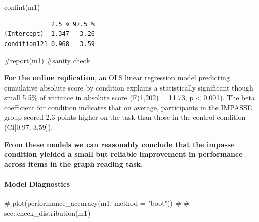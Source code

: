 \documentclass[
  letterpaper,
  DIV=11,
  numbers=noendperiod]{scrreprt}
\let\oldparagraph\paragraph
\renewcommand{\paragraph}[1]{\oldparagraph{#1}\mbox{}}
\newenvironment{Shaded}{\begin{snugshade}}{\end{snugshade}}
\newcommand{\CommentTok}[1]{\textcolor[rgb]{0.37,0.37,0.37}{#1}}
\newcommand{\FunctionTok}[1]{\textcolor[rgb]{0.28,0.35,0.67}{#1}}
\newcommand{\NormalTok}[1]{\textcolor[rgb]{0.00,0.23,0.31}{#1}}
\begin{document}
\begin{Shaded}
\begin{Highlighting}[]
\FunctionTok{confint}\NormalTok{(m1)}
\end{Highlighting}
\end{Shaded}

\begin{verbatim}
             2.5 % 97.5 %
(Intercept)  1.347   3.26
condition121 0.968   3.59
\end{verbatim}

\begin{Shaded}
\begin{Highlighting}[]
\CommentTok{\#report(m1) \#sanity check}
\end{Highlighting}
\end{Shaded}

\textbf{For the online replication}, an OLS linear regression model
predicting cumulative absolute score by condition explains a
statistically significant though small 5.5\% of variance in absolute
score (F(1,202) = 11.73, p \textless{} 0.001). The beta coefficient for
condition indicates that on average, participants in the IMPASSE group
scored 2.3 points higher on the task than those in the control condition
(CI{[}0.97, 3.59{]}).

\begin{tcolorbox}[enhanced jigsaw, toptitle=1mm, toprule=.15mm, bottomtitle=1mm, leftrule=.75mm, title=\textcolor{quarto-callout-note-color}{\faInfo}\hspace{0.5em}{Note}, opacityback=0, titlerule=0mm, opacitybacktitle=0.6, colframe=quarto-callout-note-color-frame, rightrule=.15mm, breakable, bottomrule=.15mm, colbacktitle=quarto-callout-note-color!10!white, coltitle=black, arc=.35mm, colback=white, left=2mm]
\textbf{From these models we can reasonably conclude that the impasse
condition yielded a small but reliable improvement in performance across
items in the graph reading task.}
\end{tcolorbox}

\hypertarget{model-diagnostics}{%
\paragraph{\texorpdfstring{\textbf{Model
Diagnostics}}{Model Diagnostics}}\label{model-diagnostics}}

\begin{Shaded}
\begin{Highlighting}[]
\CommentTok{\# plot(performance\_accuracy(m1, method = "boot"))}
\CommentTok{\# }
\CommentTok{\# see::check\_distribution(m1)}
\end{Highlighting}
\end{Shaded}
\end{document}
